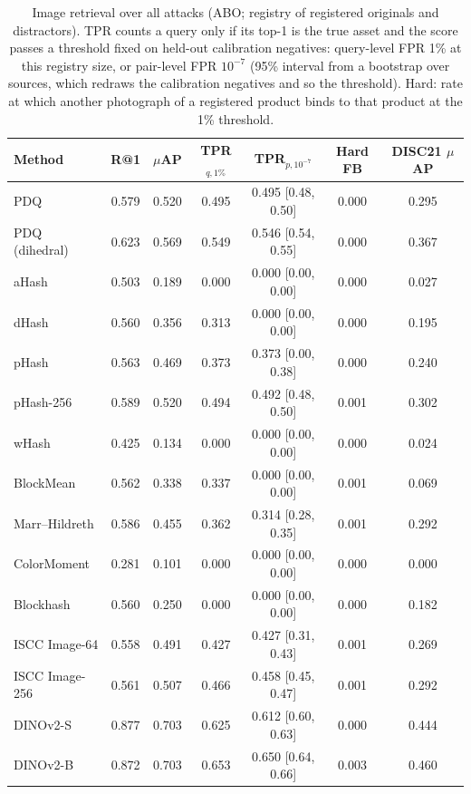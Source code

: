 \begin{table}[!t]
\centering
\footnotesize
\caption{Image retrieval over all attacks (ABO; registry of registered originals and distractors). TPR counts a query only if its top-1 is the true asset and the score passes a threshold fixed on held-out calibration negatives: query-level FPR 1\% at this registry size, or pair-level FPR $10^{-7}$ (95\% interval from a bootstrap over sources, which redraws the calibration negatives and so the threshold). Hard: rate at which another photograph of a registered product binds to that product at the 1\% threshold.}
\label{tab:fp-image}
\setlength{\tabcolsep}{3pt}
\begin{tabular}{lcccccc}
\toprule
Method & R@1 & $\mu$AP & TPR$_{q,1\%}$ & TPR$_{p,10^{-7}}$ & Hard FB & DISC21 $\mu$AP \\
\midrule
PDQ & 0.579 & 0.520 & 0.495 & 0.495 \tiny[0.48, 0.50] & 0.000 & 0.295 \\
PDQ (dihedral) & 0.623 & 0.569 & 0.549 & 0.546 \tiny[0.54, 0.55] & 0.000 & 0.367 \\
aHash & 0.503 & 0.189 & 0.000 & 0.000 \tiny[0.00, 0.00] & 0.000 & 0.027 \\
dHash & 0.560 & 0.356 & 0.313 & 0.000 \tiny[0.00, 0.00] & 0.000 & 0.195 \\
pHash & 0.563 & 0.469 & 0.373 & 0.373 \tiny[0.00, 0.38] & 0.000 & 0.240 \\
pHash-256 & 0.589 & 0.520 & 0.494 & 0.492 \tiny[0.48, 0.50] & 0.001 & 0.302 \\
wHash & 0.425 & 0.134 & 0.000 & 0.000 \tiny[0.00, 0.00] & 0.000 & 0.024 \\
BlockMean & 0.562 & 0.338 & 0.337 & 0.000 \tiny[0.00, 0.00] & 0.001 & 0.069 \\
Marr–Hildreth & 0.586 & 0.455 & 0.362 & 0.314 \tiny[0.28, 0.35] & 0.001 & 0.292 \\
ColorMoment & 0.281 & 0.101 & 0.000 & 0.000 \tiny[0.00, 0.00] & 0.000 & 0.000 \\
Blockhash & 0.560 & 0.250 & 0.000 & 0.000 \tiny[0.00, 0.00] & 0.000 & 0.182 \\
ISCC Image-64 & 0.558 & 0.491 & 0.427 & 0.427 \tiny[0.31, 0.43] & 0.001 & 0.269 \\
ISCC Image-256 & 0.561 & 0.507 & 0.466 & 0.458 \tiny[0.45, 0.47] & 0.001 & 0.292 \\
DINOv2-S & 0.877 & 0.703 & 0.625 & 0.612 \tiny[0.60, 0.63] & 0.000 & 0.444 \\
DINOv2-B & 0.872 & 0.703 & 0.653 & 0.650 \tiny[0.64, 0.66] & 0.003 & 0.460 \\

\end{tabular}
\end{table}
